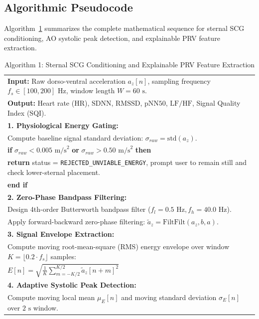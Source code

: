 \subsection{Algorithmic Pseudocode}
Algorithm~\ref{alg:scg_dsp} summarizes the complete mathematical sequence for sternal SCG conditioning, AO systolic peak detection, and explainable PRV feature extraction.

\begin{table}[!htbp]
	\centering
	\caption{Algorithm 1: Sternal SCG Conditioning and Explainable PRV Feature Extraction}
	\label{alg:scg_dsp}
	\begin{tabular}{|p{13.5cm}|}
		\hline
		\textbf{Input:} Raw dorso-ventral acceleration $a_z[n]$, sampling frequency $f_s \in [100, 200]\text{ Hz}$, window length $W=60\text{ s}$.\\
		\textbf{Output:} Heart rate ($\text{HR}$), $\text{SDNN}$, $\text{RMSSD}$, $\text{pNN50}$, $\text{LF/HF}$, Signal Quality Index ($\text{SQI}$).\\
		\hline
		\textbf{1. Physiological Energy Gating:} \\
		\quad Compute baseline signal standard deviation: $\sigma_{raw} = \text{std}(a_z)$.\\
		\quad \textbf{if} $\sigma_{raw} < 0.005\text{ m/s}^2$ \textbf{or} $\sigma_{raw} > 0.50\text{ m/s}^2$ \textbf{then}\\
		\quad \quad \textbf{return} status = \texttt{REJECTED\_UNVIABLE\_ENERGY}, prompt user to remain still and check lower-sternal placement.\\
		\quad \textbf{end if}\\
		\textbf{2. Zero-Phase Bandpass Filtering:} \\
		\quad Design 4th-order Butterworth bandpass filter ($f_l = 0.5\text{ Hz}, f_h = 40.0\text{ Hz}$).\\
		\quad Apply forward-backward zero-phase filtering: $\tilde{a}_z = \text{FiltFilt}(a_z, b, a)$.\\
		\textbf{3. Signal Envelope Extraction:} \\
		\quad Compute moving root-mean-square (RMS) energy envelope over window $K = \lfloor 0.2 \cdot f_s \rfloor$ samples:\\
		\quad \quad $E[n] = \sqrt{\frac{1}{K}\sum_{m=-K/2}^{K/2} \tilde{a}_z[n+m]^2}$\\
		\textbf{4. Adaptive Systolic Peak Detection:} \\
		\quad Compute moving local mean $\mu_E[n]$ and moving standard deviation $\sigma_E[n]$ over $2\text{ s}$ window.\\

\end{tabular}
\end{table}
